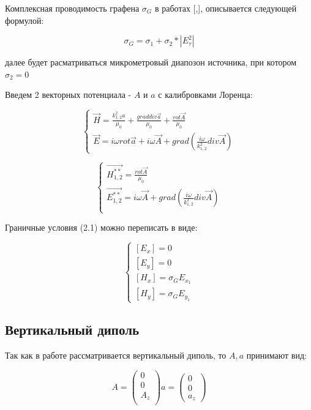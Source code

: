 	Комплексная проводимость графена $\sigma_G$ в работах [,], описывается следующей формулой:
	
	$$\sigma_G = \sigma_1 + \sigma_2 * |E_{\tau}^2|$$
	
	далее будет расматриваться микрометровый диапозон источника, при котором $\sigma_2 = 0$
	
	
	Введем 2 векторных потенциала - $A$ и $a$ с калибровками Лоренца:
	
	
	
	\begin{equation}
		\begin{cases}
			\vec{H} = \frac{k^2_{1, 2}a}{\mu_0} + \frac{grad div \vec{a}}{\mu_0} + \frac{rot \vec{A}}{\mu_0} \\
			\vec{E} = i \omega rot \vec{a} +  i \omega \vec{A} + grad(\frac{i \omega}{k^2_{1, 2}} div \vec{A}) 
		\end{cases}
	\end{equation}
	
	\begin{equation*}
		\begin{cases}
			\vec{H^{**}_{1, 2}} = \frac{rot \vec{A}}{\mu_0} \\
			\vec{E^{**}_{1, 2}} = i \omega \vec{A} + grad(\frac{i \omega}{k^2_{1, 2}} div \vec{A}) \\
		\end{cases}
	\end{equation*}
	
	Граничные условия (2.1) можно переписать в виде:
	
	\begin{equation*}
		\tag{2.2}
		\begin{cases}
			[E_x] = 0 \\
			[E_y] = 0 \\
			[H_x] = \sigma_G E_{x_1} \\
			[H_y] = \sigma_G E_{y_1}
			
		\end{cases}
	\end{equation*}
	
	\subsection{Вертикальный диполь}
	
	
	Так как в работе рассматривается вертикальный диполь, то $A, a$ принимают вид:
	
	\begin{equation*}
		A = 
		\begin{pmatrix}
			0 \\ 0 \\ A_z \\
		\end{pmatrix}
		a = 
		\begin{pmatrix}
			0 \\ 0 \\ a_z
		\end{pmatrix}
	\end{equation*}
	
